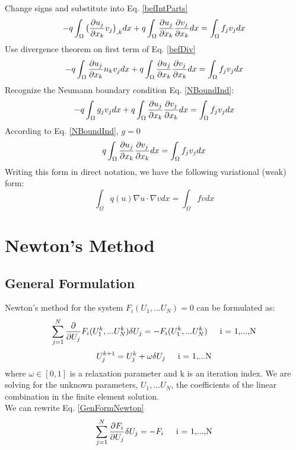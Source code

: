 \documentclass[12pt,3p]{article}
\begin{document}
Change signs and substitute into Eq. \ref{befIntParts}
\begin{equation}\label{befDiv}
- q \int_{\Omega} \big( \pdv{u_j}{x_k} v_j \big)_{,k} dx + q \int_{\Omega} \pdv{u_j}{x_k} \pdv{v_j}{x_k} dx = \int_{\Omega} f_j v_j dx
\end{equation}
Use divergence theorem on first term of Eq. \ref{befDiv}
\begin{equation*}
- q \int_{\Omega} \pdv{u_j}{x_k} n_k v_j dx + q \int_{\Omega} \pdv{u_j}{x_k} \pdv{v_j}{x_k} dx = \int_{\Omega} f_j v_j dx
\end{equation*}
Recognize the Neumann boundary condition Eq. \ref{NBoundInd}: 
\begin{equation*}
- q \int_{\Omega} g_j v_j dx + q \int_{\Omega} \pdv{u_j}{x_k} \pdv{v_j}{x_k} dx = \int_{\Omega} f_j v_j dx
\end{equation*}
According to Eq. \ref{NBoundInd}, $g = 0$
\begin{equation*}
q \int_{\Omega} \pdv{u_j}{x_k} \pdv{v_j}{x_k} dx = \int_{\Omega} f_j v_j dx
\end{equation*}
Writing this form in direct notation, we have the following variational (weak) form: 
\begin{equation}\label{weakForm}
\int_{\Omega} q(u) \nabla u \cdot \nabla vdx = \int_{\Omega} f v dx
\end{equation}


\section{Newton's Method}
\subsection{General Formulation}
Newton's method for the system $F_i(U_1,...U_N)  = 0$ can be formulated as: 
\begin{equation}\label{GenFormNewton}
\sum_{j = 1}^N \pdv{}{U_j} F_i(U_1^k,...U_N^k) \delta U_j = - F_i(U_1^k,...U_N^k) \indent \text{i = 1,...,N}
\end{equation}
\begin{equation}\label{GenFormRelax}
U_j^{k+1} = U_j^{k} + \omega \delta U_j \indent \text{i = 1,...N} 
\end{equation}
where $\omega \in [0,1]$ is a relaxation parameter and k is an iteration index. We are solving for the unknown parameters, $U_1,...U_N$, the coefficients of the linear combination in the finite element solution. \\
We can rewrite Eq. \ref{GenFormNewton}
\begin{equation} \label{SimpGenForm}
\sum_{j = 1}^N \pdv{F_i}{U_j} \delta U_j = - F_i \indent \text{i = 1,...,N}
\end{equation}
\end{document}
